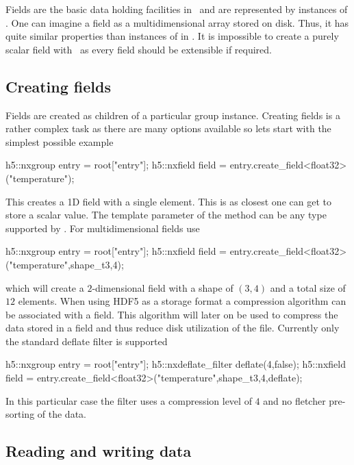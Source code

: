 
Fields are the basic data holding facilities in \libpniio\ and are represented
by instances of \nxfield. One can imagine a field as a multidimensional array 
stored on disk. Thus, it has quite similar properties than instances of 
 in \libpnicore.  It is impossible to create a purely 
scalar field with \libpniio\ as every field should be extensible if required. 

\subsection{Creating fields}

Fields are created as children of a particular group instance. Creating fields
is a rather complex task as there are many options available so lets start with 
the simplest possible example
\begin{cppcode}
h5::nxgroup entry = root["entry"];
h5::nxfield field = entry.create_field<float32>("temperature");
\end{cppcode}
This creates a 1D field with a single element. This is as closest one can get 
to store a scalar value. The template parameter of the 
method can be any type supported by \libpnicore.  For multidimensional fields
use 
\begin{cppcode}
h5::nxgroup entry = root["entry"];
h5::nxfield field = entry.create_field<float32>("temperature",shape_t{3,4});
\end{cppcode}
which will create a $2$-dimensional field with a shape of $(3,4)$ and a total
size of $12$ elements.
When using HDF5 as a storage format a compression algorithm can be associated
with a field. This algorithm will later on be used to compress the data stored
in a field and thus reduce disk utilization of the file. 
Currently only the standard deflate filter is supported 
\begin{cppcode}
h5::nxgroup entry = root["entry"];
h5::nxdeflate_filter deflate(4,false);
h5::nxfield field = entry.create_field<float32>("temperature",shape_t{3,4},deflate);
\end{cppcode}
In this particular case the filter uses a compression level of $4$ and no 
fletcher pre-sorting of the data. 

\subsection{Reading and writing data}

